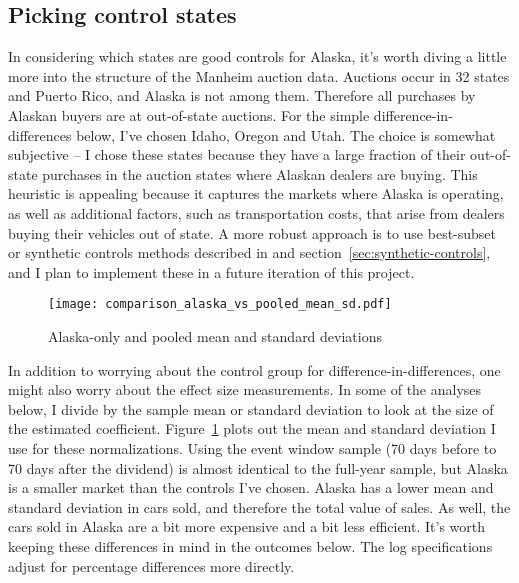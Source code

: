 \documentclass[11pt,letterpaper,oneside]{article}
\begin{document}
\begin{doublespacing}
\subsection{Picking control states}
\label{sec:picking-controls}
In considering which states are good controls for Alaska, it's worth diving a little more into the structure of the Manheim auction data.
Auctions occur in 32 states and Puerto Rico, and Alaska is not among them.
Therefore all purchases by Alaskan buyers are at out\hyp{}of\hyp{}state auctions.
For the simple difference\hyp{}in\hyp{}differences below, I've chosen Idaho, Oregon and Utah.
The choice is somewhat subjective -- I chose these states because they have a large fraction of their out\hyp{}of\hyp{}state purchases in the auction states where Alaskan dealers are buying.
This heuristic is appealing because it captures the markets where Alaska is operating, as well as additional factors, such as transportation costs, that arise from dealers buying their vehicles out of state.
A more robust approach is to use best\hyp{}subset or synthetic controls methods described in \textcite{DoudchenkoImbens2016DD} and section~\ref{sec:synthetic-controls}, and I plan to implement these in a future iteration of this project.

\begin{figure}[bth]
	\caption{Alaska-only and pooled mean and standard deviations}
	\label{fig:alaska_vs_pooled_mean_sd}
	\texttt{[image: comparison\_alaska\_vs\_pooled\_mean\_sd.pdf]}
\end{figure}

In addition to worrying about the control group for difference\hyp{}in\hyp{}differences, one might also worry about the effect size measurements.
In some of the analyses below, I divide by the sample mean or standard deviation to look at the size of the estimated coefficient.
Figure~\ref{fig:alaska_vs_pooled_mean_sd} plots out the mean and standard deviation I use for these normalizations.
Using the event window sample (70 days before to 70 days after the dividend) is almost identical to the full\hyp{}year sample, but Alaska is a smaller market than the controls I've chosen.
Alaska has a lower mean and standard deviation in cars sold, and therefore the total value of sales.
As well, the cars sold in Alaska are a bit more expensive and a bit less efficient.
It's worth keeping these differences in mind in the outcomes below.
The log specifications adjust for percentage differences more directly.


\end{doublespacing}
\end{document}
